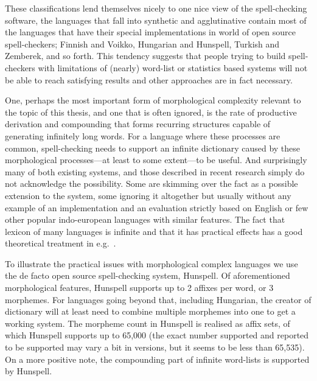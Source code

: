 \documentclass[officiallayout]{unihelcompling}
\begin{document}
These classifications lend themselves nicely to one nice view of the
spell-checking software, the languages that fall into synthetic and
agglutinative contain most of the languages that have their special
implementations in world of open source spell-checkers; Finnish and Voikko,
Hungarian and Hunspell, Turkish and Zemberek, and so forth.  This tendency
suggests that people trying to build spell-checkers with limitations of
(nearly) word-list or statistics based systems will not be able to reach
satisfying results and other approaches are in fact necessary.

One, perhaps the most important form of morphological complexity relevant to
the topic of this thesis, and one that is often ignored, is the rate of
productive derivation and compounding that forms recurring structures capable
of generating infinitely long words. For a language where these processes are
common, spell-checking needs to support an infinite dictionary caused by these
morphological processes---at least to some extent---to be useful. And
surprisingly many of both existing systems, and those described in recent
research simply do not acknowledge the possibility. Some are skimming over the
fact as a possible extension to the system, some ignoring it altogether but
usually without any example of an implementation and an evaluation strictly
based on English or few other popular indo-european languages with similar
features.  The fact that lexicon of many languages is infinite and that it has
practical effects has a good theoretical treatment in
e.g.~\citet{kornai2002many}.

To illustrate the practical issues with morphological complex languages we use
the de facto open source spell-checking system, Hunspell. Of aforementioned
morphological features, Hunspell supports up to 2 affixes per word, or 3
morphemes. For languages going beyond that, including Hungarian, the creator of
dictionary will at least need to combine multiple morphemes into one to get a
working system. The morpheme count in Hunspell is realised as affix sets, of
which Hunspell supports up to 65,000 (the exact number supported and reported
to be supported may vary a bit in versions, but it seems to be less than
65,535). On a more positive note, the compounding part of infinite word-lists
is supported by Hunspell.
\end{document}
